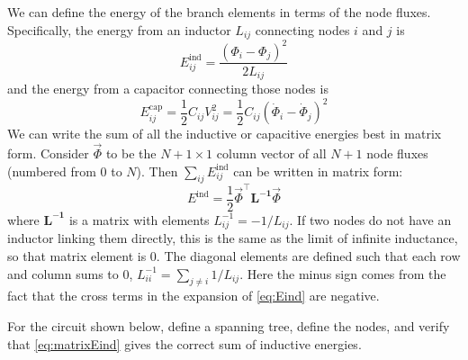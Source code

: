 We can define the energy of the branch elements in terms of the node fluxes. Specifically, the energy from an inductor $L_{ij}$ connecting nodes $i$ and $j$ is
\begin{equation}
\label{eq:Eind}
    E_{ij}^\mathrm{ind} = \frac{(\Phi_i-\Phi_j)^2}{2L_{ij}}
\end{equation}
and the energy from a capacitor connecting those nodes is
\begin{equation}
\label{eq:Ecap}
    E_{ij}^\mathrm{cap} = \frac{1}{2}C_{ij}V_{ij}^2 = \frac{1}{2}C_{ij}(\dot{\Phi}_i - \dot{\Phi}_j)^2
\end{equation}
We can write the sum of all the inductive or capacitive energies best in matrix form. Consider $\vec{\Phi}$ to be the $N+1\times 1$ column vector of all $N+1$ node fluxes (numbered from 0 to $N$). Then $\sum_{ij} E_{ij}^\mathrm{ind}$ can be written in matrix form:
\begin{equation}
    \label{eq:matrixEind}
    E^\mathrm{ind} = \frac{1}{2}\vec{\Phi}^\top\mathbf{L^{-1}}\vec{\Phi}
\end{equation}
where $\mathbf{L^{-1}}$ is a matrix with elements $L_{ij}^{-1} = -1/L_{ij}$. If two nodes do not have an inductor linking them directly, this is the same as the limit of infinite inductance, so that matrix element is 0. The diagonal elements are defined such that each row and column sums to 0, $L_{ii}^{-1} =\sum_{j\neq i}1/L_{ij}$. Here the minus sign comes from the fact that the cross terms in the expansion of \cref{eq:Eind} are negative.

\begin{exercise}
    For the circuit shown below, define a spanning tree, define the nodes, and verify that \cref{eq:matrixEind} gives the correct sum of inductive energies.
\end{exercise}


